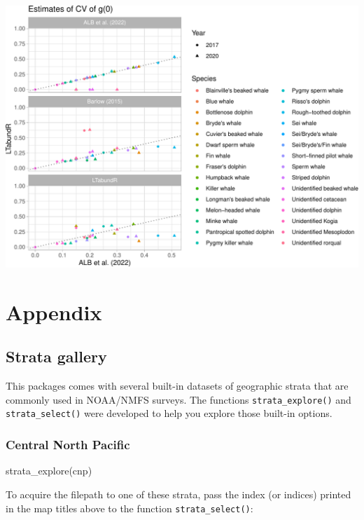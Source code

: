 \documentclass[
]{book}
\newenvironment{Shaded}{\begin{snugshade}}{\end{snugshade}}
\newcommand{\FunctionTok}[1]{\textcolor[rgb]{0.00,0.00,0.00}{#1}}
\newcommand{\NormalTok}[1]{#1}
\newcommand{\StringTok}[1]{\textcolor[rgb]{0.31,0.60,0.02}{#1}}
\begin{document}
\includegraphics{figures/unnamed-chunk-386-1.pdf}

\hypertarget{part-appendix}{%
\part{Appendix}\label{part-appendix}}

\hypertarget{stratagallery}{%
\chapter{Strata gallery}\label{stratagallery}}

This packages comes with several built-in datasets of geographic strata that are commonly used in NOAA/NMFS surveys. The functions \texttt{strata\_explore()} and \texttt{strata\_select()} were developed to help you explore those built-in options.

\hypertarget{central-north-pacific}{%
\section*{Central North Pacific}\label{central-north-pacific}}

\begin{Shaded}
\begin{Highlighting}[]
\FunctionTok{strata\_explore}\NormalTok{(}\StringTok{\textquotesingle{}cnp\textquotesingle{}}\NormalTok{)}
\end{Highlighting}
\end{Shaded}

To acquire the filepath to one of these strata, pass the index (or indices) printed in the map titles above to the function \texttt{strata\_select()}:
\end{document}
